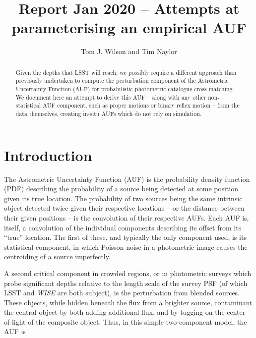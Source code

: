 \documentclass[fleqn,usenatbib]{mnras}
\title[]{Report Jan 2020 – Attempts at parameterising an empirical AUF}
\author[Tom J. Wilson and Tim Naylor]{
Tom J. Wilson
and Tim Naylor
\\
}
\date{}
\begin{document}
\label{firstpage}
\pagerange{\pageref{firstpage}--\pageref{lastpage}}
\maketitle
\begin{abstract}

Given the depths that LSST will reach, we possibly require a different approach than previously undertaken to compute the perturbation component of the Astrometric Uncertainty Function (AUF) for probabilistic photometric catalogue cross-matching. We document here an attempt to derive this AUF -- along with any other non-statistical AUF component, such as proper motions or binary reflex motion -- from the data themselves, creating in-situ AUFs which do not rely on simulation.

\end{abstract}


\section{Introduction}

The Astrometric Uncertainty Function (AUF) is the probability density function (PDF) describing the probability of a source being detected at some position given its true location. The probability of two sources being the same intrinsic object detected twice given their respective locations -- or the distance between their given positions -- is the convolution of their respective AUFs. Each AUF is, itself, a convolution of the individual components describing its offset from its ``true'' location. The first of these, and typically the only component used, is its statistical component, in which Poisson noise in a photometric image causes the centroiding of a source imperfectly.

A second critical component in crowded regions, or in photometric surveys which probe significant depths relative to the length scale of the survey PSF (of which LSST and \textit{WISE} are both subject), is the perturbation from blended sources. These objects, while hidden beneath the flux from a brighter source, contaminant the central object by both adding additional flux, and by tugging on the center-of-light of the composite object. Thus, in this simple two-component model, the AUF is
\end{document}
